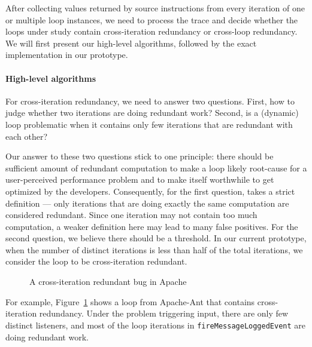 After collecting values returned by source instructions from every iteration
of one or multiple loop instances, we need to process the trace and decide
whether the loops under study contain cross-iteration redundancy or 
cross-loop redundancy. We will first present our high-level algorithms, followed
by the exact implementation in our prototype.

\paragraph{High-level algorithms}
For cross-iteration redundancy, we need to answer two questions. 
First, how to judge whether
two iterations are doing redundant work?
Second, is a (dynamic) loop problematic when it contains only few 
iterations that are
redundant with each other?

Our answer to these two questions stick to one principle: there should be
sufficient amount of redundant computation to make a loop likely root-cause
for a user-perceived performance problem and to make itself worthwhile to
get optimized by the developers. Consequently,
for the first question, \Tool takes a strict 
definition --- only iterations that are doing exactly the same computation are
considered redundant. Since one iteration may not contain too much computation,
a weaker definition here may lead to many false positives. For the 
second question, we believe there should be a threshold. In our current 
prototype,
when the number of distinct iterations is less than half of the total iterations, 
we consider the loop to be cross-iteration redundant. 

\begin{figure}
  \centering
  \mbox{}
  \caption{A cross-iteration redundant bug in Apache}
  \label{fig:Apache37184}
\end{figure}

For example, Figure~\ref{fig:Apache37184} shows a loop from Apache-Ant that
contains cross-iteration redundancy.
Under the problem triggering input, there are
only few distinct listeners, and most of the
loop iterations in \texttt{fireMessageLoggedEvent}
are doing redundant work. 





